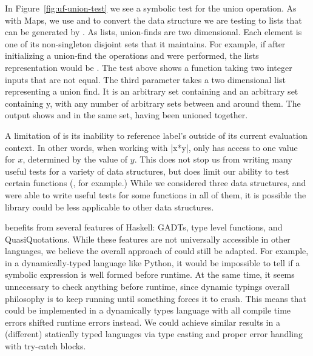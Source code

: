 \par In Figure~\ref{fig:uf-union-test} we see a symbolic test for the union operation.
As with Maps, we
use  and  to convert the data structure we
are testing to lists that can be generated by \ourDSL.
As lists, union-finds are two dimensional. Each element is one of its
non-singleton disjoint sets that it maintains. 
For example, if after initializing a union-find the operations  and  were performed, the lists representation would be \hskin{[[1, 100], [5, 7]]}.
The test above shows a function taking two integer inputs that are not equal. 
The third parameter takes a two dimensional list representing a union find. It is an arbitrary set containing  and an arbitrary set containing y, with any number of arbitrary sets between and around them. The output shows  and  in the same set, having been unioned together.


A limitation of \ourDSL is its inability to reference label's outside of its current evaluation context.
In other words, when working with \hskin|x*{y}|, 
\ourDSL only has access to one value for $x$, determined by the value of $y$.
This does not stop us from writing many useful tests
for a variety of data structures, but does limit our ability to
test certain functions (, for example.)
While we considered three data structures, and were able to write useful tests for some functions in all of them,
it is possible the library could be less applicable to other data structures.

\ourDSL benefits from several features of Haskell:
GADTs, type level functions, and QuasiQuotations.
While these features are not universally accessible in other languages,
we believe the overall approach of \ourDSL could still be adapted.
For example, in a 
dynamically-typed language like Python, it would be impossible to tell if a symbolic expression is well formed before runtime.
At the same time, it seems unnecessary to check anything before runtime, since dynamic typings overall philosophy is to keep running until
something forces it to crash.
This means that \ourDSL could be implemented in a dynamically types language
with all
compile time errors shifted runtime errors instead.
We could achieve similar results in a (different) statically typed languages
via type casting and proper error handling with try-catch blocks.